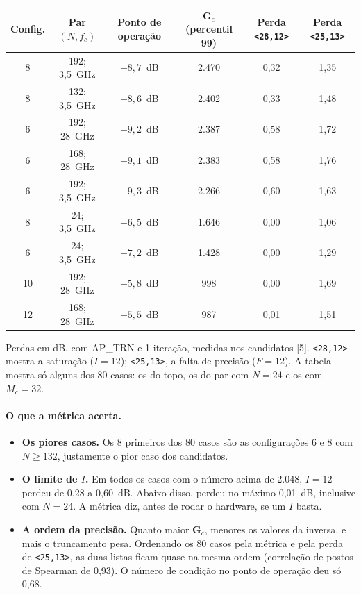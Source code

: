 \documentclass[11pt]{article}
\begin{document}
\begin{center}
\small
\renewcommand{\arraystretch}{1.15}
\begin{tabular}{|c|c|c|c|c|c|}
\hline
Config. & Par $(N, f_c)$ & Ponto de operação & $\mathbf G_c$ (percentil 99) & Perda \texttt{<28,12>} & Perda \texttt{<25,13>} \\
\hline
8  & 192; 3,5~GHz & $-8{,}7$~dB & 2.470 & 0,32 & 1,35 \\
8  & 132; 3,5~GHz & $-8{,}6$~dB & 2.402 & 0,33 & 1,48 \\
6  & 192; 28~GHz  & $-9{,}2$~dB & 2.387 & 0,58 & 1,72 \\
6  & 168; 28~GHz  & $-9{,}1$~dB & 2.383 & 0,58 & 1,76 \\
6  & 192; 3,5~GHz & $-9{,}3$~dB & 2.266 & 0,60 & 1,63 \\
\hline
8  & 24; 3,5~GHz  & $-6{,}5$~dB & 1.646 & 0,00 & 1,06 \\
6  & 24; 3,5~GHz  & $-7{,}2$~dB & 1.428 & 0,00 & 1,29 \\
\hline
10 & 192; 28~GHz  & $-5{,}8$~dB & 998   & 0,00 & 1,69 \\
12 & 168; 28~GHz  & $-5{,}5$~dB & 987   & 0,01 & 1,51 \\
\hline
\end{tabular}
\end{center}
Perdas em dB, com AP\_TRN e 1 iteração, medidas nos candidatos [5]. \texttt{<28,12>} mostra a
saturação ($I = 12$); \texttt{<25,13>}, a falta de precisão ($F = 12$). A tabela mostra só alguns
dos 80 casos: os do topo, os do par com $N = 24$ e os com $M_c = 32$.

\paragraph{O que a métrica acerta.}
\begin{itemize}
  \item \textbf{Os piores casos.} Os 8 primeiros dos 80 casos são as configurações 6 e 8 com
        $N \ge 132$, justamente o pior caso dos candidatos.
  \item \textbf{O limite de $I$.} Em todos os casos com o número acima de 2.048, $I = 12$ perdeu
        de 0,28 a 0,60~dB. Abaixo disso, perdeu no máximo 0,01~dB, inclusive com $N = 24$. A métrica
        diz, antes de rodar o hardware, se um $I$ basta.
  \item \textbf{A ordem da precisão.} Quanto maior $\mathbf G_c$, menores os valores da inversa,
        e mais o truncamento pesa. Ordenando os 80 casos pela métrica e pela perda de
        \texttt{<25,13>}, as duas listas ficam quase na mesma ordem (correlação de postos de
        Spearman de 0,93). O número de condição no ponto de operação deu só 0,68.
\end{itemize}
\end{document}
